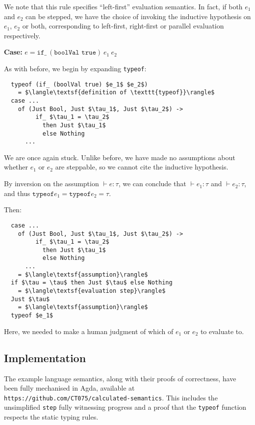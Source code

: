 \documentclass[manuscript,screen,sigplan]{acmart}
\begin{document}
We note that this rule specifies ``left-first'' evaluation semantics. In fact,
if both $e_1$ and $e_2$ can be stepped, we have the choice of invoking the
inductive hypothesis on $e_1$, $e_2$ or both, corresponding to left-first,
right-first or parallel evaluation respectively.

\hfill

\textbf{Case:} $e = \texttt{if\_}\ (\texttt{boolVal true})\ e_1\ e_2$

\hfill

As with before, we begin by expanding \texttt{typeof}:

\begin{lstlisting}
  typeof (if_ (boolVal true) $e_1$ $e_2$)
    = $\langle\textsf{definition of \texttt{typeof}}\rangle$
  case ...
    of (Just Bool, Just $\tau_1$, Just $\tau_2$) ->
         if_ $\tau_1 = \tau_2$
           then Just $\tau_1$
           else Nothing
      ...
\end{lstlisting}

We are once again stuck. Unlike before, we have made no assumptions about
whether $e_1$ or $e_2$ are steppable, so we cannot cite the inductive
hypothesis.

By inversion on the assumption $\vdash e : \tau$, we
can conclude that $\vdash e_1 : \tau$ and $\vdash e_2: \tau$, and thus
$\texttt{typeof} e_1 = \texttt{typeof} e_2 = \tau$.

Then:

\begin{lstlisting}
  case ...
    of (Just Bool, Just $\tau_1$, Just $\tau_2$) ->
         if_ $\tau_1 = \tau_2$
           then Just $\tau_1$
           else Nothing
      ...
    = $\langle\textsf{assumption}\rangle$
  if $\tau = \tau$ then Just $\tau$ else Nothing
    = $\langle\textsf{evaluation step}\rangle$
  Just $\tau$
    = $\langle\textsf{assumption}\rangle$
  typeof $e_1$
\end{lstlisting}

Here, we needed to make a human judgment of which of $e_1$ or $e_2$ to evaluate
to.

\subsection{Implementation}

The example language semantics, along with their proofs of correctness, have
been fully mechanised in Agda, available at \texttt{https://github.com/CT075/calculated-semantics}.
This includes the unsimplified \texttt{step} fully witnessing progress and a
proof that the \texttt{typeof} function respects the static typing rules.
\end{document}
